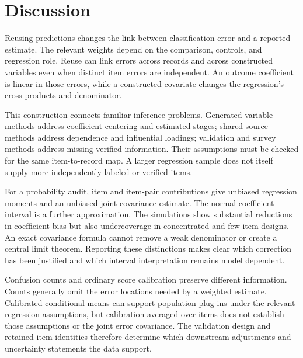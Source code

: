 \section{Discussion}
Reusing predictions changes the link between classification error and a
reported estimate. The relevant weights depend on the comparison, controls,
and regression role. Reuse can link errors across records and across
constructed variables even when distinct item errors are independent.
An outcome coefficient is linear in those errors, while a constructed
covariate changes the regression's cross-products and denominator.

This construction connects familiar inference problems. Generated-variable
methods address coefficient centering and estimated stages; shared-source
methods address dependence and influential loadings; validation and
survey methods address missing verified information. Their assumptions
must be checked for the same item-to-record map. A larger regression sample
does not itself supply more independently labeled or verified items.

For a probability audit, item and item-pair contributions give unbiased
regression moments and an unbiased joint covariance estimate. The normal
coefficient interval is a further approximation. The simulations show
substantial reductions in coefficient bias but also undercoverage in
concentrated and few-item designs. An exact covariance formula cannot
remove a weak denominator or create a central limit theorem. Reporting
these distinctions makes clear which correction has been justified and
which interval interpretation remains model dependent.

Confusion counts and ordinary score calibration preserve different
information. Counts generally omit the error locations needed by a weighted
estimate. Calibrated conditional means can support population plug-ins under
the relevant regression assumptions, but calibration averaged over items
does not establish those assumptions or the joint error covariance.
The validation design and retained item identities therefore determine
which downstream adjustments and uncertainty statements the data support.
